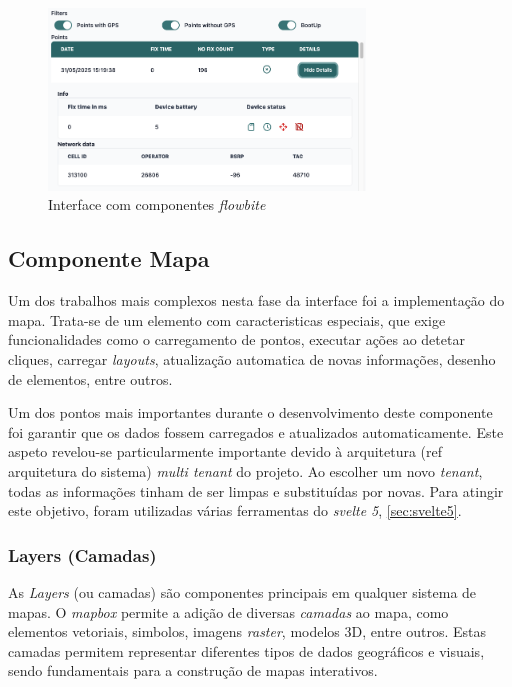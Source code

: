 \begin{figure}[h!]
    \centering
    \includegraphics[width=0.75\textwidth]{figs/flowbite.png}
    \caption{Interface com componentes \textit{flowbite}}
    \label{fig:flowbite}
\end{figure}

\subsection{Componente Mapa}\label{sec:map_comp}
Um dos trabalhos mais complexos nesta fase da interface foi a implementação do mapa. Trata-se de um elemento com caracteristicas especiais, que exige funcionalidades como o carregamento de pontos, executar ações ao detetar cliques, carregar \textit{layouts}, atualização automatica de novas informações, desenho de elementos, entre outros. 

Um dos pontos mais importantes durante o desenvolvimento deste componente foi garantir que os dados fossem carregados e atualizados automaticamente. Este aspeto revelou-se particularmente importante devido à arquitetura (ref arquitetura do sistema) \textit{multi tenant} do projeto. Ao escolher um novo \textit{tenant}, todas as informações tinham de ser limpas e substituídas por novas. Para atingir este objetivo, foram utilizadas várias ferramentas do \textit{svelte 5}, \autoref{sec:svelte5}.

\subsubsection{\textbf{Layers (Camadas)}}\label{sec:layers}
As \textit{Layers} (ou camadas) são componentes principais em qualquer sistema de mapas. O \textit{mapbox} permite a adição de diversas \textit{camadas} ao mapa, como elementos vetoriais, simbolos, imagens \textit{raster}, modelos 3D, entre outros. Estas camadas permitem representar diferentes tipos de dados geográficos e visuais, sendo fundamentais para a construção de mapas interativos.

